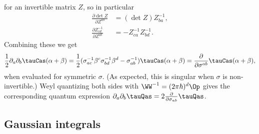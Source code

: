 \documentclass{article}
\numberwithin{equation}{section}
\begin{document}
for an invertible matrix $Z$, so in particular 
\begin{align} 
 \frac{\partial \det Z}{\partial Z^{ab}} &= (\det Z) Z^{-1}_{ba},\\
 \frac{\partial Z^{-1}_{cd}}{\partial Z^{ab}} &= -Z^{-1}_{ca}Z^{-1}_{bd}.
\end{align}
Combining these we get
\begin{align}
\frac{1}{2}\partial_a \partial_b \tauCas(\alpha+\beta)=\frac{1}{2}(\sigma^{-1}_{ac}\beta^c\sigma^{-1}_{bd}\beta^d-\sigma^{-1}_{ab})\tauCas(\alpha+\beta) = \frac{\partial}{\partial \sigma^{ab}} \tauCas(\alpha+\beta),
\end{align}
when evaluated for symmetric $\sigma$.  (As expected, this is singular when $\sigma$ is non-invertible.)  Weyl quantizing both sides with $\WW^{-1}=(2\pi\hbar)^{d}\Op$ gives the corresponding quantum expression $\partial_a \partial_b \tauQas = 2\frac{\partial}{\partial \sigma_{ab}} \tauQas$.

\subsection{Gaussian integrals}\label{sec:gaussian-integrals}
\end{document}
